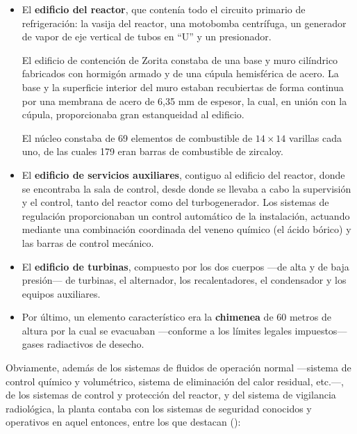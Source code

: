 \begin{itemize}
  \item El \textbf{edificio del reactor}, que contenía todo el circuito primario de refrigeración: la vasija del reactor, una motobomba centrífuga, un generador de vapor de eje vertical de tubos en ``U'' y un presionador.
  
  El edificio de contención de Zorita constaba de una base y muro cilíndrico fabricados con hormigón armado y de una cúpula hemisférica de acero. La base y la superficie interior del muro estaban recubiertas de forma continua por una membrana de acero de 6,35 mm de espesor, la cual, en unión con la cúpula, proporcionaba gran estanqueidad al edificio. 

  El núcleo constaba de 69 elementos de combustible de $14 \times 14$ varillas cada uno, de las cuales 179 eran barras de combustible de zircaloy.

  \item El \textbf{edificio de servicios auxiliares}, contiguo al edificio del reactor, donde se encontraba la sala de control, desde donde se llevaba a cabo la supervisión y el control, tanto del reactor como del turbogenerador. Los sistemas de regulación proporcionaban un control automático de la instalación, actuando mediante una combinación coordinada del veneno químico (el ácido bórico) y las barras de control mecánico.

  \item El \textbf{edificio de turbinas}, compuesto por los dos cuerpos ---de alta y de baja presión--- de turbinas,  el alternador, los recalentadores, el condensador y los equipos auxiliares.
  
  \item Por último, un elemento característico era la \textbf{chimenea} de 60 metros de altura por la cual se evacuaban ---conforme a los límites legales impuestos--- gases radiactivos de desecho.
\end{itemize}

Obviamente, además de los sistemas de fluidos de operación normal ---sistema de control químico y volumétrico, sistema de eliminación del calor residual, etc.---, de los sistemas de control y protección del reactor, y del sistema de vigilancia radiológica, la planta contaba con los sistemas de seguridad conocidos y operativos en aquel entonces, entre los que destacan (\cite{documentacion_sgiz}):


